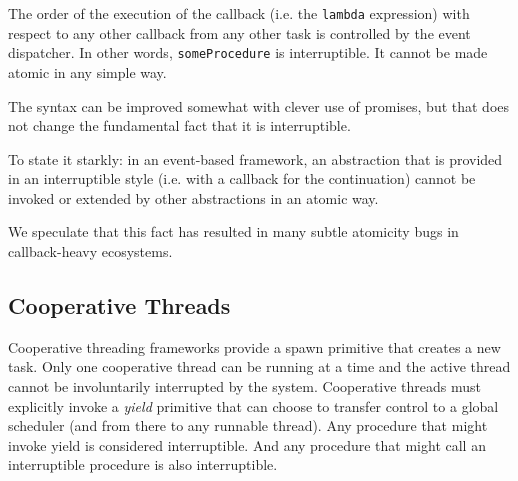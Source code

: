\documentclass[preprint, 10pt, numbers]{sigplanconf}
\begin{document}
The order of the execution of the callback (i.e. the \texttt{lambda} expression) with  respect to any other callback from any other task is controlled by the event dispatcher.
In other words, \texttt{someProcedure} is interruptible.
It cannot be made atomic in any simple way.

The syntax can be improved somewhat with clever use of promises, but that does not change the fundamental fact that it is interruptible.

To state it starkly: in an event-based framework, an abstraction that is provided in an interruptible style (i.e. with a callback for the continuation) cannot be invoked or extended by other abstractions in an atomic way.

We speculate that this fact has resulted in many subtle atomicity bugs in callback-heavy ecosystems.

\subsection{Cooperative Threads}




Cooperative threading frameworks provide a spawn primitive that creates a new task.
Only one cooperative thread can be running at a time and the active thread cannot be involuntarily interrupted by the system.
Cooperative threads must explicitly invoke a \emph{yield} primitive that can choose to transfer control to a global scheduler (and from there to any runnable thread).
Any procedure that might invoke yield is considered interruptible.
And any procedure that might call an interruptible procedure is also interruptible.
\end{document}
